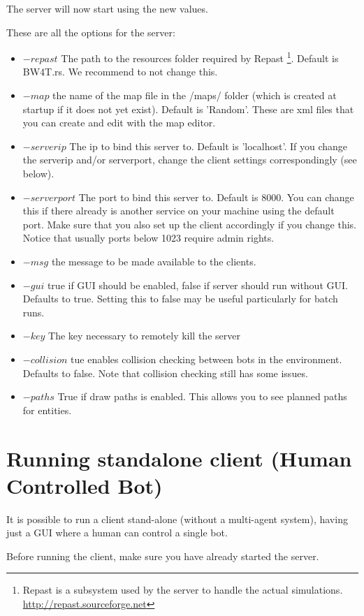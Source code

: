 \documentclass[11pt,a4paper]{article}
\begin{document}
The server will now start using the new values.

These are all the  options for the server:
\begin{itemize}
\item $-repast$ The path to the resources folder required by Repast \footnote{Repast is a subsystem used by the server to handle the actual simulations. \url{http://repast.sourceforge.net} }. Default is BW4T.rs. We recommend to not change this.  
\item $-map$ the name of the map file in the /maps/ folder (which is created at startup if it does not yet exist). Default is 'Random'. These are xml files that you can create and edit with the map editor.
\item $-serverip$ The ip to bind this server to. Default is 'localhost'. If you change the serverip and/or serverport, change the client settings correspondingly (see below). 
\item $-serverport$  The port to bind this server to. Default is 8000. You can change this if there already is another service on your machine using the default port. Make sure that you also set up the client accordingly if you change this. Notice that usually ports below 1023 require admin rights.
\item $-msg$ the message to be made available to the clients.
\item $-gui$ true if GUI should be enabled, false if server should run without GUI. Defaults to true. Setting this to false  may be useful particularly for batch runs.
\item $-key$ The key necessary to remotely kill the server
\item $-collision$ tue enables collision checking between bots in the environment. Defaults to false. Note that collision checking still has some issues.
\item $-paths$ True if draw paths is enabled. This allows you to see planned paths for entities.
\end{itemize}

\section{Running standalone client (Human Controlled Bot)}\label{ch:runclient}
It is possible to run a client stand-alone (without a multi-agent system), having just a GUI where a human can control a single bot.

Before running the client, make sure you have already started the server. 
\end{document}
